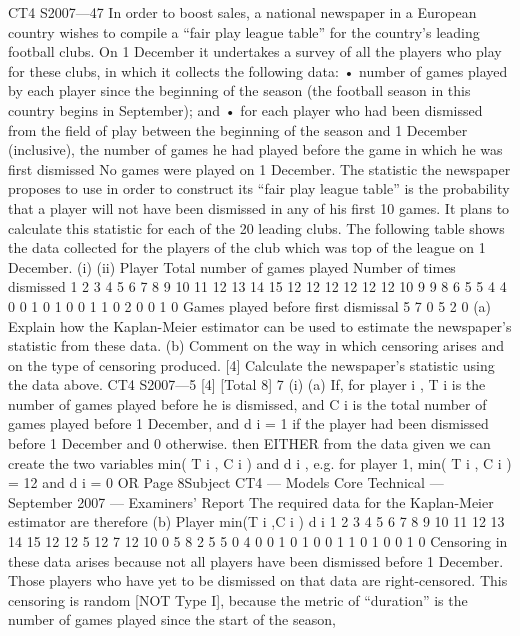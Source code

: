 \documentclass[a4paper,12pt]{article}
\begin{document}
\begin{enumerate}
CT4 S2007—47
In order to boost sales, a national newspaper in a European country wishes to compile
a “fair play league table” for the country’s leading football clubs. On 1 December it
undertakes a survey of all the players who play for these clubs, in which it collects the
following data:
• number of games played by each player since the beginning of the season (the
football season in this country begins in September); and
• for each player who had been dismissed from the field of play between the
beginning of the season and 1 December (inclusive), the number of games he had
played before the game in which he was first dismissed
No games were played on 1 December.
The statistic the newspaper proposes to use in order to construct its “fair play league
table” is the probability that a player will not have been dismissed in any of his first
10 games. It plans to calculate this statistic for each of the 20 leading clubs.
The following table shows the data collected for the players of the club which was top
of the league on 1 December.
(i)
(ii)
Player Total number
of games played Number of times
dismissed
1
2
3
4
5
6
7
8
9
10
11
12
13
14
15 12
12
12
12
12
12
10
9
9
8
6
5
5
4
4 0
0
1
0
1
0
0
1
1
0
2
0
0
1
0
Games
played before
first dismissal
5
7
0
5
2
0
(a) Explain how the Kaplan-Meier estimator can be used to estimate the
newspaper’s statistic from these data.
(b) Comment on the way in which censoring arises and on the type of
censoring produced.
[4]
Calculate the newspaper’s statistic using the data above.
CT4 S2007—5
[4]
[Total 8]
7
(i)
(a)
If, for player i , T i is the number of games played before he is
dismissed, and C i is the total number of games played before
1 December, and d i = 1 if the player had been dismissed before
1 December and 0 otherwise.
then
EITHER
from the data given we can create the two variables
min( T i , C i )
and d i ,
e.g. for player 1, min( T i , C i ) = 12 and d i = 0
OR
Page 8Subject CT4 — Models Core Technical — September 2007 — Examiners’ Report
The required data for the Kaplan-Meier estimator are therefore
(b)
Player min(T i ,C i ) d i
1
2
3
4
5
6
7
8
9
10
11
12
13
14
15 12
12
5
12
7
12
10
0
5
8
2
5
5
0
4 0
0
1
0
1
0
0
1
1
0
1
0
0
1
0
Censoring in these data arises because not all players have been
dismissed before 1 December. Those players who have yet to be
dismissed on that data are right-censored.
This censoring is random [NOT Type I], because the metric of
“duration” is the number of games played since the start of the season,

\end{enumerate}
\end{document}
